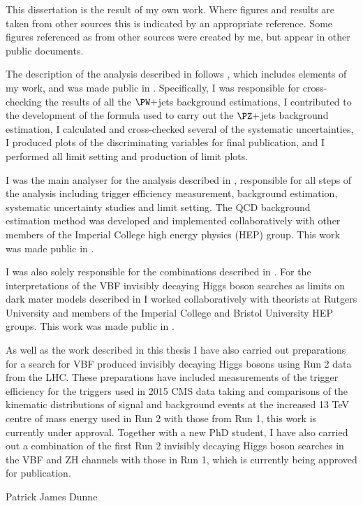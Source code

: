 \begin{declaration}
  This dissertation is the result of my own work. Where figures and results are taken from other sources this is indicated by an appropriate reference. Some figures referenced as from other sources were created by me, but appear in other public documents. 

The description of the analysis described in  follows , which includes elements of my work, and was made public in . Specifically, I was responsible for cross-checking the results of all the $\PW+$jets background estimations, I contributed to the development of the formula used to carry out the $\PZ+$jets background estimation, I calculated and cross-checked several of the systematic uncertainties, I produced plots of the discriminating variables for final publication, and I performed all limit setting and production of limit plots. 

I was the main analyser for the analysis described in , responsible for all steps of the analysis including trigger efficiency measurement, background estimation, systematic uncertainty studies and limit setting. The QCD background estimation method was developed and implemented collaboratively with other members of the Imperial College high energy physics (HEP) group. This work was made public in .

I was also solely responsible for the combinations described in . For the interpretations of the VBF invisibly decaying Higgs boson searches as limits on dark mater models described in  I worked collaboratively with theorists at Rutgers University and members of the Imperial College and Bristol University HEP groups. This work was made public in .

As well as the work described in this thesis I have also carried out preparations for a search for VBF produced invisibly decaying Higgs bosons using Run 2 data from the LHC. These preparations have included measurements of the trigger efficiency for the triggers used in 2015 CMS data taking and comparisons of the kinematic distributions of signal and background events at the increased 13 TeV centre of mass energy used in Run 2 with those from Run 1, this work is currently under approval. Together with a new PhD student, I have also carried out a combination of the first Run 2 invisibly decaying Higgs boson searches in the VBF and ZH channels with those in Run 1, which is currently being approved for publication.


  \vspace*{1cm}
  \begin{flushright}
    Patrick James Dunne
  \end{flushright}
\end{declaration}


